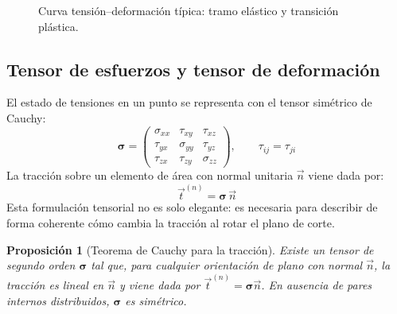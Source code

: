 \documentclass[12pt, a4paper]{article}
\theoremstyle{plain}
\newtheorem{proposicion}[teorema]{Proposición}
\theoremstyle{definition}
\theoremstyle{remark}
\newcommand{\ve}[1]{\vec{#1}}
\begin{document}
\begin{figure}[H]
  \centering
  \caption{Curva tensión--deformación típica: tramo elástico y transición plástica.}
\end{figure}
\subsection{Tensor de esfuerzos y tensor de deformación}

El estado de tensiones en un punto se representa con el tensor simétrico de Cauchy:
\begin{equation}
  \boldsymbol{\sigma} =
  \begin{pmatrix}
    \sigma_{xx} & \tau_{xy} & \tau_{xz}\\
    \tau_{yx} & \sigma_{yy} & \tau_{yz}\\
    \tau_{zx} & \tau_{zy} & \sigma_{zz}
  \end{pmatrix},
  \qquad \tau_{ij}=\tau_{ji}
\end{equation}
La tracción sobre un elemento de área con normal unitaria $\ve{n}$ viene dada por:
\begin{equation}
  \ve{t}^{(n)} = \boldsymbol{\sigma}\,\ve{n}
\end{equation}
Esta formulación tensorial no es solo elegante: es necesaria para describir de forma
coherente cómo cambia la tracción al rotar el plano de corte.
\begin{proposicion}[Teorema de Cauchy para la tracción]
Existe un tensor de segundo orden $\boldsymbol{\sigma}$ tal que, para cualquier orientación
de plano con normal $\ve{n}$, la tracción es lineal en $\ve{n}$ y viene dada por
$\ve{t}^{(n)}=\boldsymbol{\sigma}\ve{n}$. En ausencia de pares internos distribuidos,
$\boldsymbol{\sigma}$ es simétrico.
\end{proposicion}
\end{document}
